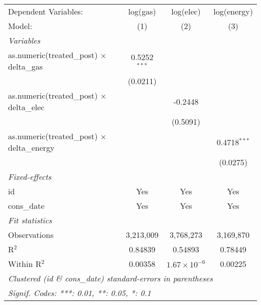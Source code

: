 
\begin{tabular}{lccc}
   \tabularnewline\midrule\midrule
   Dependent Variables:                                & log(gas)       & log(elec)             & log(energy)\\
   Model:                                              & (1)            & (2)                   & (3)\\
   \midrule \emph{Variables} &   &   &  \\
   as.numeric(treated\_post) $\times$ delta\_gas    & 0.5252$^{***}$ &                       &   \\
                                                       & (0.0211)       &                       &   \\
   as.numeric(treated\_post) $\times$ delta\_elec   &                & -0.2448               &   \\
                                                       &                & (0.5091)              &   \\
   as.numeric(treated\_post) $\times$ delta\_energy &                &                       & 0.4718$^{***}$\\
                                                       &                &                       & (0.0275)\\
   \midrule \emph{Fixed-effects} &   &   &  \\
   id                                                  & Yes            & Yes                   & Yes\\
   cons\_date                                         & Yes            & Yes                   & Yes\\
   \midrule \emph{Fit statistics} &   &   &  \\
   Observations                                        & 3,213,009      & 3,768,273             & 3,169,870\\
   R$^2$                                               & 0.84839        & 0.54893               & 0.78449\\
   Within R$^2$                                        & 0.00358        & $1.67\times 10^{-6}$ & 0.00225\\
   \midrule\midrule\multicolumn{4}{l}{\emph{Clustered (id \& cons\_date) standard-errors in parentheses}}\\
   \multicolumn{4}{l}{\emph{Signif. Codes: ***: 0.01, **: 0.05, *: 0.1}}\\
\end{tabular}


